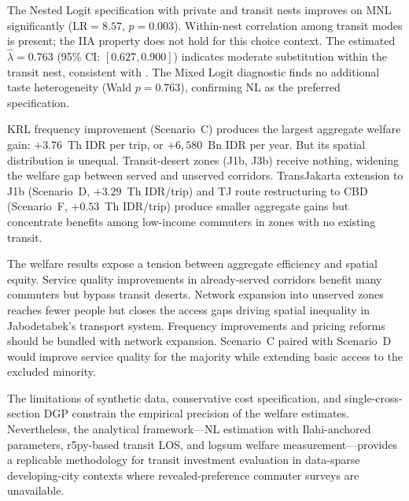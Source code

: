 \documentclass[12pt,a4paper]{article}
\begin{document}
The Nested Logit specification with private and transit nests improves on MNL significantly ($\text{LR} = 8.57$, $p = 0.003$). Within-nest correlation among transit modes is present; the IIA property does not hold for this choice context. The estimated $\hat{\lambda} = 0.763$ (95\% CI: $[0.627, 0.900]$) indicates moderate substitution within the transit nest, consistent with \citet{bastarianto2019}. The Mixed Logit diagnostic finds no additional taste heterogeneity (Wald $p = 0.763$), confirming NL as the preferred specification.

KRL frequency improvement (Scenario~C) produces the largest aggregate welfare gain: $+3.76$~Th IDR per trip, or $+6{,}580$~Bn IDR per year. But its spatial distribution is unequal. Transit-desert zones (J1b, J3b) receive nothing, widening the welfare gap between served and unserved corridors. TransJakarta extension to J1b (Scenario~D, $+3.29$~Th IDR/trip) and TJ route restructuring to CBD (Scenario~F, $+0.53$~Th IDR/trip) produce smaller aggregate gains but concentrate benefits among low-income commuters in zones with no existing transit.

The welfare results expose a tension between aggregate efficiency and spatial equity. Service quality improvements in already-served corridors benefit many commuters but bypass transit deserts. Network expansion into unserved zones reaches fewer people but closes the access gaps driving spatial inequality in Jabodetabek's transport system. Frequency improvements and pricing reforms should be bundled with network expansion. Scenario~C paired with Scenario~D would improve service quality for the majority while extending basic access to the excluded minority.

The limitations of synthetic data, conservative cost specification, and single-cross-section DGP constrain the empirical precision of the welfare estimates. Nevertheless, the analytical framework---NL estimation with Ilahi-anchored parameters, r5py-based transit LOS, and logsum welfare measurement---provides a replicable methodology for transit investment evaluation in data-sparse developing-city contexts where revealed-preference commuter surveys are unavailable.
\end{document}
